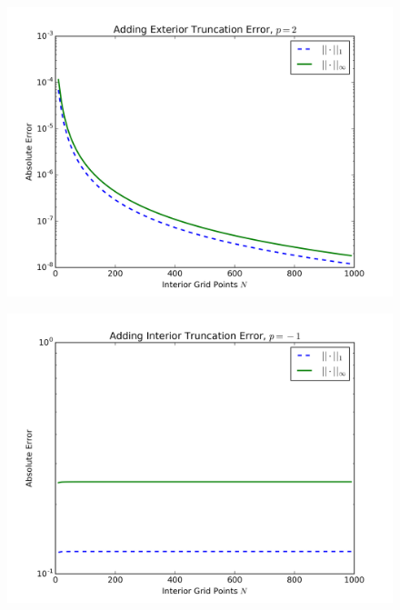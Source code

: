 \documentclass{article} %
\theoremstyle{plain}
\numberwithin{equation}{section} %
\numberwithin{figure}{section} %
\numberwithin{table}{section} %
\begin{document}
\begin{enumerate}[\ \ (a)]
\begin{figure}[ht!]
            \begin{minipage}[b]{0.5\linewidth}
                \centering
                \includegraphics[width=\linewidth]{figure_2c1_ext_p=2.png}
                \vspace{4ex}
            \end{minipage} 
        \end{figure}
        \begin{figure}[ht!]
            \begin{minipage}[b]{0.5\linewidth}
                \centering
                \includegraphics[width=\linewidth]{figure_2c1_int_p=-1.png}
                \vspace{4ex}
            \end{minipage}%

\end{figure}
\end{enumerate}
\end{document}
